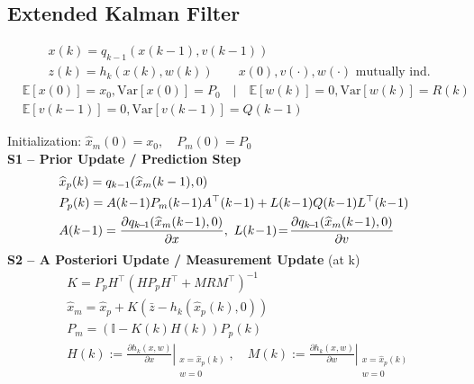 \subsection{Extended Kalman Filter}

\begin{align*}
    &x(k) = q_{k-1}(x(k-1), v(k-1))\\
    &z(k)= h_k(x(k),w(k))  \quad \quad x(0), v(\cdot), w(\cdot) \text{ mutually ind.}
\end{align*} 
\begin{align*}
    &\mathbb{E}[x(0)] = x_0, \mathrm{Var}[x(0)] = P_0 \quad | \quad \mathbb{E}[w(k)] = 0, \mathrm{Var}[w(k)] = R(k)\\
    &\mathbb{E}[v(k\!-\!1)] = 0, \mathrm{Var}[v(k\!-\!1)] = Q(k\!-\!1)
\end{align*}

\vfill\null\columnbreak

Initialization: $\widehat{x}_m(0) = x_0, \quad P_m(0) = P_0$\\
\textbf{S1 -- Prior Update / Prediction Step}
\begin{align*}
    \hspace{-2em}&\widehat{x}_p(k) = q_{k-1}(\widehat{x}_m(k-1), 0) \\
    \hspace{-2em}&P_p(k) = A(k\!-\!1)P_m(k\!-\!1)A^\top(k\!-\!1) + L(k\!-\!1)Q(k\!-\!1)L^\top(k\!-\!1)\\
    &A(k\!-\!1) = \frac{\partial q_{k\!-\!1}(\widehat{x}_m(k\!-\!1),0)}{\partial x}, \ L(k\!-\!1) \!=\! \frac{\partial q_{k\!-\!1}(\widehat{x}_m(k\!-\!1),0)}{\partial v}
\end{align*}
\textbf{S2 -- A Posteriori Update / Measurement Update} (at k)
\begin{align*}
    &K = P_p H^\top \!\left( H P_p H^\top
    \!+\! M R M^\top \right)^{-1} \\
    &\widehat{x}_m = \widehat{x}_p + K 
    \left( \bar{z} - h_k(\widehat{x}_p(k),0) \right) \\
    &P_m = \left(\mathbb{I} - K(k) H(k)\right) P_p(k)\\
    &H(k) := \left. \frac{\partial h_{k}(x,w)}{\partial x} \right|_{\substack{x=\widehat{x}_p(k)\\w = 0}}, \quad
    M(k) := \left. \frac{\partial h_{k}(x,w)}{\partial w} \right|_{\substack{x=\widehat{x}_p(k)\\w = 0}}
\end{align*}

